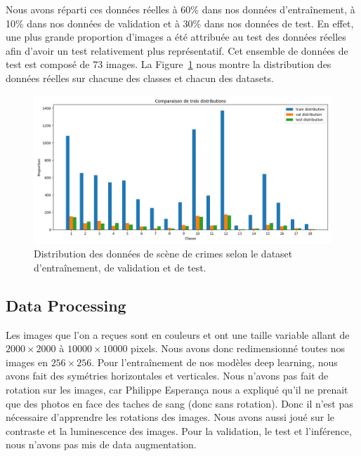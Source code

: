 Nous avons réparti ces données réelles à 60\% dans nos données d'entraînement, à 10\% dans nos données de validation et à 30\% dans nos données de test. En effet, une plus grande proportion d'images a été attribuée au test des données réelles afin d'avoir un test relativement plus représentatif. Cet ensemble de données de test est composé de 73 images. La Figure~\ref{fig:distribution real} nous montre la distribution des données réelles sur chacune des classes et chacun des datasets.

\begin{figure}[ht]
    \centering
    \includegraphics[width=0.8\linewidth]{../asset/distribution_train_val_test.png}
    \caption{Distribution des données de scène de crimes selon le dataset d'entraînement, de validation et de test.}
    \label{fig:distribution real}
\end{figure}

\subsection{Data Processing}
Les images que l'on a reçues sont en couleurs et ont une taille variable allant de $2000\times2000$ à $10000\times10000$ pixels. Nous avons donc redimensionné toutes nos images en $256\times256$. Pour l'entraînement de nos modèles deep learning, nous avons fait des symétries horizontales et verticales. Nous n'avons pas fait de rotation sur les images, car Philippe Esperança nous a expliqué qu'il ne prenait que des photos en face des taches de sang (donc sans rotation). Donc il n'est pas nécessaire d'apprendre les rotations des images. Nous avons aussi joué sur le contraste et la luminescence des images. Pour la validation, le test et l'inférence, nous n'avons pas mis de data augmentation.
